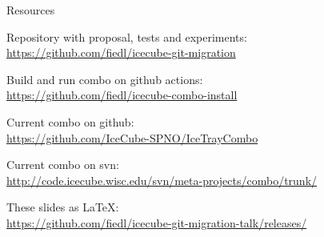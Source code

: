 
\begin{frame}{Resources}
  \begin{center}

    Repository with proposal, tests and experiments: \\
    \url{https://github.com/fiedl/icecube-git-migration}

    \vspace{1em}

    Build and run combo on github actions: \\
    \url{https://github.com/fiedl/icecube-combo-install}

    \vspace{1em}

    Current combo on github: \\
    \url{https://github.com/IceCube-SPNO/IceTrayCombo}

    \vspace{1em}

    Current combo on svn: \\
    \url{http://code.icecube.wisc.edu/svn/meta-projects/combo/trunk/}

    \vspace{1em}

    These slides as \LaTeX: \\
    \url{https://github.com/fiedl/icecube-git-migration-talk/releases/}

  \end{center}
\end{frame}
